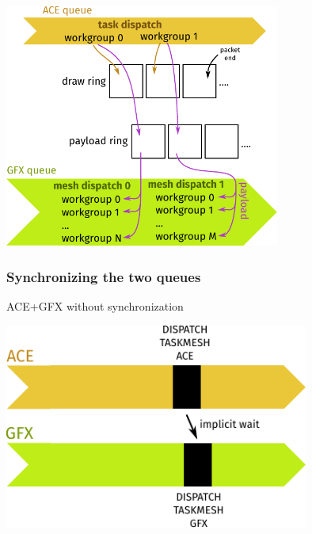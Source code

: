 \documentclass[aspectratio=169,t,xcolor=table]{beamer}
\begin{document}
\begin{frame}{}

    \LARGE

    \begin{center}
        \includegraphics[height=8cm]{figs/task_queues_draw_payload_ring.svg.pdf}
    \end{center}

\end{frame}

\begin{frame}{}
    \frametitle{Synchronizing the two queues}
\end{frame}

\begin{frame}{ACE+GFX without synchronization}

    \LARGE

    \begin{center}
        \includegraphics[height=6.75cm]{figs/task_sync_1.svg.pdf}
    \end{center}

\end{frame}
\end{document}
